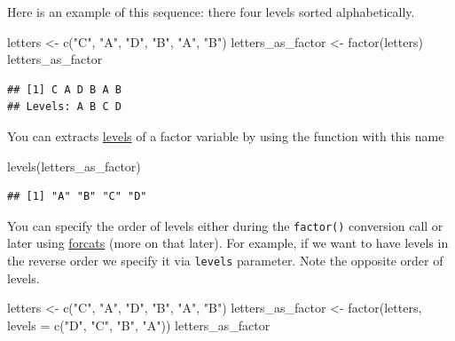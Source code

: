 \documentclass[
]{book}
\newenvironment{Shaded}{\begin{snugshade}}{\end{snugshade}}
\newcommand{\AttributeTok}[1]{\textcolor[rgb]{0.77,0.63,0.00}{#1}}
\newcommand{\FunctionTok}[1]{\textcolor[rgb]{0.00,0.00,0.00}{#1}}
\newcommand{\NormalTok}[1]{#1}
\newcommand{\OtherTok}[1]{\textcolor[rgb]{0.56,0.35,0.01}{#1}}
\newcommand{\StringTok}[1]{\textcolor[rgb]{0.31,0.60,0.02}{#1}}
\begin{document}
Here is an example of this sequence: there four levels sorted alphabetically.

\begin{Shaded}
\begin{Highlighting}[]
\NormalTok{letters }\OtherTok{\textless{}{-}} \FunctionTok{c}\NormalTok{(}\StringTok{"C"}\NormalTok{, }\StringTok{"A"}\NormalTok{, }\StringTok{"D"}\NormalTok{, }\StringTok{"B"}\NormalTok{, }\StringTok{"A"}\NormalTok{, }\StringTok{"B"}\NormalTok{)}
\NormalTok{letters\_as\_factor }\OtherTok{\textless{}{-}} \FunctionTok{factor}\NormalTok{(letters)}
\NormalTok{letters\_as\_factor}
\end{Highlighting}
\end{Shaded}

\begin{verbatim}
## [1] C A D B A B
## Levels: A B C D
\end{verbatim}

You can extracts \href{https://stat.ethz.ch/R-manual/R-devel/library/base/html/levels.html}{levels} of a factor variable by using the function with this name

\begin{Shaded}
\begin{Highlighting}[]
\FunctionTok{levels}\NormalTok{(letters\_as\_factor)}
\end{Highlighting}
\end{Shaded}

\begin{verbatim}
## [1] "A" "B" "C" "D"
\end{verbatim}

You can specify the order of levels either during the \texttt{factor()} conversion call or later using \href{https://forcats.tidyverse.org/}{forcats} (more on that later). For example, if we want to have levels in the reverse order we specify it via \texttt{levels} parameter. Note the opposite order of levels.

\begin{Shaded}
\begin{Highlighting}[]
\NormalTok{letters }\OtherTok{\textless{}{-}} \FunctionTok{c}\NormalTok{(}\StringTok{"C"}\NormalTok{, }\StringTok{"A"}\NormalTok{, }\StringTok{"D"}\NormalTok{, }\StringTok{"B"}\NormalTok{, }\StringTok{"A"}\NormalTok{, }\StringTok{"B"}\NormalTok{)}
\NormalTok{letters\_as\_factor }\OtherTok{\textless{}{-}} \FunctionTok{factor}\NormalTok{(letters, }\AttributeTok{levels =} \FunctionTok{c}\NormalTok{(}\StringTok{"D"}\NormalTok{, }\StringTok{"C"}\NormalTok{, }\StringTok{"B"}\NormalTok{, }\StringTok{"A"}\NormalTok{))}
\NormalTok{letters\_as\_factor}
\end{Highlighting}
\end{Shaded}
\end{document}
